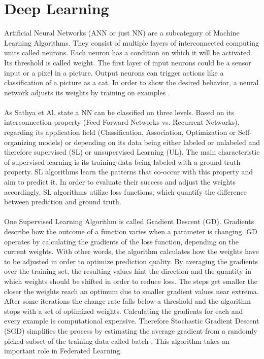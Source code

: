 \documentclass[
	ngerman,
	ruledheaders=section,%
	class=report,%
	thesis={type=bachelor},%
	accentcolor=1b,%
	custommargins=true,%
	marginpar=false,%
	parskip=half-,%
	fontsize=11pt,%
]{tudapub}
\begin{document}
\section{Deep Learning}
Artificial Neural Networks (ANN or just NN) are a subcategory of Machine Learning Algorithms. They consist of multiple layers of interconnected computing units called neurons. Each neuron has a condition on which it will be activated. Its threshold is called weight. The first layer of input neurons could be a sensor input or a pixel in a picture. Output neurons can trigger actions like a classification of a picture as a cat. In order to show the desired behavior, a neural network adjusts its weights by training on examples \cite{schmidhuber2015deep}.\\
\\
As Sathya et Al.\cite{sathya2013comparison} state a NN can be classified on three levels. Based on its interconnection property (Feed Forward Networks vs. Recurrent Networks), regarding its application field (Classification, Association, Optimization or Self-organizing models) or depending on its data being either labeled or unlabeled and therefore supervised (SL) or unsupervised Learning (UL). The main characteristic of supervised learning is its training data being labeled with a ground truth property. SL algorithms learn the patterns that co-occur with this property and aim to predict it. In order to evaluate their success and adjust the weights accordingly, SL algorithms utilize loss functions, which quantify the difference between prediction and ground truth.\\
\\
One Supervised Learning Algorithm is called Gradient Descent (GD). Gradients describe how the outcome of a function varies when a parameter is changing. GD operates by calculating the gradients of the loss function, depending on the current weights. With other words, the algorithm calculates how the weights have to be adjusted in order to optimize prediction quality. By averaging the gradients over the training set, the resulting values hint the direction and the quantity in which weights should be shifted in order to reduce loss. The steps get smaller the closer the weights reach an optimum due to smaller gradient values near extrema. After some iterations the change rate falls below a threshold and the algorithm stops with a set of optimized weights. Calculating the gradients for each and every example is computational expensive. Therefore Stochastic Gradient Descent (SGD) simplifies the process by estimating the average gradient from a randomly picked subset of the training data called batch \cite{bottou2010large}. This algorithm takes an important role in Federated Learning. 
\end{document}
